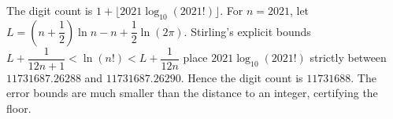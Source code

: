 The digit count is $1+\lfloor2021\log_{10}(2021!)\rfloor$. For $n=2021$, let $L=(n+\dfrac{1}{2})\ln n-n+\dfrac{1}{2}\ln(2\pi)$. Stirling's explicit bounds $L+\dfrac{1}{12n+1}<\ln(n!)<L+\dfrac{1}{12n}$ place $2021\log_{10}(2021!)$ strictly between $11731687.26288$ and $11731687.26290$. Hence the digit count is $\boxed{11731688}$. The error bounds are much smaller than the distance to an integer, certifying the floor.
